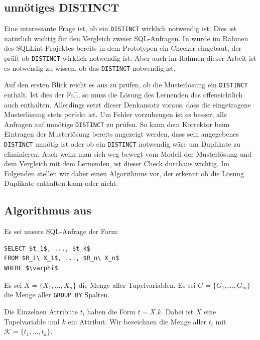 \subsection{unnötiges DISTINCT}

Eine interessante Frage ist, ob ein \verb|DISTINCT| wirklich notwendig ist. Dies ist natürlich wichtig für den Vergleich zweier SQL-Anfragen. In \cite{brass2} wurde im Rahmen des SQLLint-Projektes bereits in dem Prototypen ein Checker eingebaut, der prüft ob \verb|DISTINCT| wirklich notwendig ist. Aber auch im Rahmen dieser Arbeit ist es notwendig zu wissen, ob das \verb|DISTINCT| notwendig ist. 

Auf den ersten Blick reicht es aus zu prüfen, ob die Musterlösung ein \verb|DISTINCT| enthält. Ist dies der Fall, so muss die Lösung des Lernenden das offensichtlich auch enthalten. Allerdings setzt dieser Denkansatz voraus, dass die eingetragene Musterlösung stets perfekt ist. Um Fehler vorzubeugen ist es besser, alle Anfragen auf unnötige \verb|DISTINCT| zu prüfen. So kann dem Korrektor beim Eintragen der Musterlösung bereits angezeigt werden, dass sein angegebenes \verb|DISTINCT| unnötig ist oder ob ein \verb|DISTINCT| notwendig wäre um Duplikate zu eliminieren. Auch wenn man sich weg bewegt vom Modell der Musterlösung und dem Vergleich mit dem Lernenden, ist dieser Check durchaus wichtig. Im Folgenden stellen wir daher einen Algorithmus vor, der erkennt ob die Lösung Duplikate enthalten kann oder nicht.

\subsection{Algorithmus aus \cite{sql1folien}}

Es sei unsere SQL-Anfrage der Form:

\begin{lstlisting}[mathescape]
SELECT $t_1$, ..., $t_k$
FROM $R_1\ X_1$, ..., $R_n\ X_n$
WHERE $\varphi$
\end{lstlisting}

Es sei $X=\{X_1, ..., X_n\}$ die Menge aller Tupelvariablen. Es sei $G=\{G_1, ..., G_m\}$ die Menge aller \verb|GROUP BY| Spalten.

Die Einzelnen Attribute $t_i$ haben die Form $t = X.k$. Dabei ist $X$ eine Tupelvariable und $k$ ein Attribut. Wir bezeichnen die Menge aller $t_i$ mit $\mathcal{K}=\{t_1,...,t_k\}$.

